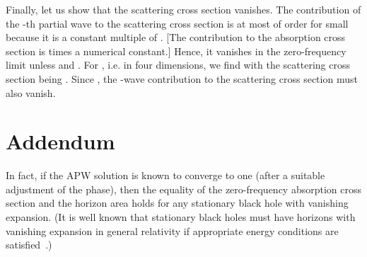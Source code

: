 \documentclass[a4paper,12pt]{article}
\begin{document}
Finally, let us show that the scattering cross section vanishes.  
The contribution of the \coordHE{}-th partial wave to the scattering cross
section is at most of order \coordHE{} for small \myHighlight{$\omega$}\coordHE{}
because it is a constant multiple of
\coordHE{}. 
[The contribution to the absorption cross section is 
\coordHE{} times a numerical constant.]
Hence, it vanishes in the zero-frequency limit unless \coordHE{} and \coordHE{}.
For \coordHE{}, i.e. in four dimensions, we find
\coordHE{}
with the scattering cross section being \coordHE{}.  Since \coordHE{}, the 
\coordHE{}-wave contribution to the scattering cross section must also vanish.

\section*{Addendum}

In fact, if the APW solution is known to converge to one (after a suitable
adjustment of the phase), then the equality of the zero-frequency absorption
cross section and the horizon area holds for any stationary black hole with
vanishing expansion.
(It is well known that
stationary black holes must have horizons with vanishing 
expansion in general relativity if appropriate
energy conditions are satisfied~\cite{Hawking,Carter}.) 
\end{document}
